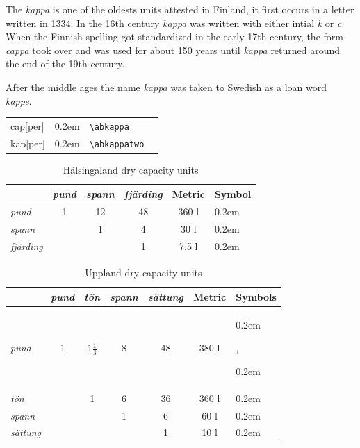\documentclass[a4paper]{article}
\newcommand{\samplefont}{\fontsize{16}{16}\abcursivefamily\spaceskip0.2em}
\newcommand{\sample}[1]{{\samplefont #1 \strut}}
\newcommand{\ltxncmd}[1]{\texttt{\textbackslash{}#1}}
\begin{document}
\begin{description}
  The \emph{kappa} is one of the oldests units attested in Finland, it
  first occurs in a letter written in 1334. In the 16th century
  \emph{kappa} was written with either intial \emph{k} or \emph{c}.
  When the Finnish spelling got standardized in the early 17th
  century, the form \emph{cappa} took over and was used for about 150
  years until \emph{kappa} returned around the end of the 19th
  century.

  After the middle ages the name \emph{kappa} was taken to Swedish as
  a loan word \emph{kappe}.
  \begin{center}
    \begin{tabular}{llll}
      {}cap[per]  & \sample{\abkappa} & \ltxncmd{abkappa} \\
      {}kap[per] & \sample{\abkappatwo} & \ltxncmd{abkappatwo}    \\
    \end{tabular}
  \end{center}


\begin{table}
\begin{tabular}{lccc|cl}
  & \emph{pund} & \emph{spann}  & \emph{fjärding}  &  Metric &  Symbol \\
  \hline
  \emph{pund}      & 1 & 12 & 48 & 360 l & \sample{\abpund} \\
  \emph{spann}     &   & 1 & 4   & 30 l   & \sample{\abspann} \\
  \emph{fjärding}  &   &   & 1   & 7.5 l & \sample{\abfjarding} \\
\end{tabular}
  \caption{Hälsingaland dry capacity units}
  \label{tab:halsingaland_volume}
\end{table}
\begin{table}
  \begin{tabular}{lcccc|cl}
    & \emph{pund} & \emph{tön} & \emph{spann} & \emph{sättung} & Metric
    & Symbols\\
    \hline 
    \emph{pund}      & 1 & $1\frac{1}{3} $ &  8 & 48 & 380 l &
    \sample{\abpund}, \sample{\abpundthree} \\ 
    \emph{tön}       &   & 1 &  6 & 36 & 360 l & \sample{\abthyn} \\
    \emph{spann}     &   &   &  1 &  6 &  60 l & \sample{\abspann} \\
    \emph{sättung}   &   &   &    &  1 &  10 l & \sample{\absixth}\\
  \end{tabular}
  \caption{Uppland dry capacity units}
  \label{tab:uppland_volume}
\end{table}






\end{description}
\end{document}
